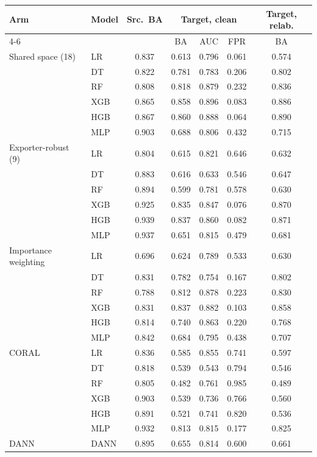 \begin{tabular}{llccccc}
\toprule
Arm & Model & Src.\ BA & \multicolumn{3}{c}{Target, clean} & Target, relab. \\
\cmidrule(lr){4-6}
 & & & BA & AUC & FPR & BA \\
\midrule
Shared space (18) & LR & 0.837 & 0.613 & 0.796 & 0.061 & 0.574 \\
 & DT & 0.822 & 0.781 & 0.783 & 0.206 & 0.802 \\
 & RF & 0.808 & 0.818 & 0.879 & 0.232 & 0.836 \\
 & XGB & 0.865 & 0.858 & 0.896 & 0.083 & 0.886 \\
 & HGB & 0.867 & 0.860 & 0.888 & 0.064 & 0.890 \\
 & MLP & 0.903 & 0.688 & 0.806 & 0.432 & 0.715 \\
\midrule
Exporter-robust (9) & LR & 0.804 & 0.615 & 0.821 & 0.646 & 0.632 \\
 & DT & 0.883 & 0.616 & 0.633 & 0.546 & 0.647 \\
 & RF & 0.894 & 0.599 & 0.781 & 0.578 & 0.630 \\
 & XGB & 0.925 & 0.835 & 0.847 & 0.076 & 0.870 \\
 & HGB & 0.939 & 0.837 & 0.860 & 0.082 & 0.871 \\
 & MLP & 0.937 & 0.651 & 0.815 & 0.479 & 0.681 \\
\midrule
Importance weighting & LR & 0.696 & 0.624 & 0.789 & 0.533 & 0.630 \\
 & DT & 0.831 & 0.782 & 0.754 & 0.167 & 0.802 \\
 & RF & 0.788 & 0.812 & 0.878 & 0.223 & 0.830 \\
 & XGB & 0.831 & 0.837 & 0.882 & 0.103 & 0.858 \\
 & HGB & 0.814 & 0.740 & 0.863 & 0.220 & 0.768 \\
 & MLP & 0.842 & 0.684 & 0.795 & 0.438 & 0.707 \\
\midrule
CORAL & LR & 0.836 & 0.585 & 0.855 & 0.741 & 0.597 \\
 & DT & 0.818 & 0.539 & 0.543 & 0.794 & 0.546 \\
 & RF & 0.805 & 0.482 & 0.761 & 0.985 & 0.489 \\
 & XGB & 0.903 & 0.539 & 0.736 & 0.766 & 0.560 \\
 & HGB & 0.891 & 0.521 & 0.741 & 0.820 & 0.536 \\
 & MLP & 0.932 & 0.813 & 0.815 & 0.177 & 0.825 \\
\midrule
DANN & DANN & 0.895 & 0.655 & 0.814 & 0.600 & 0.661 \\
\bottomrule
\end{tabular}
